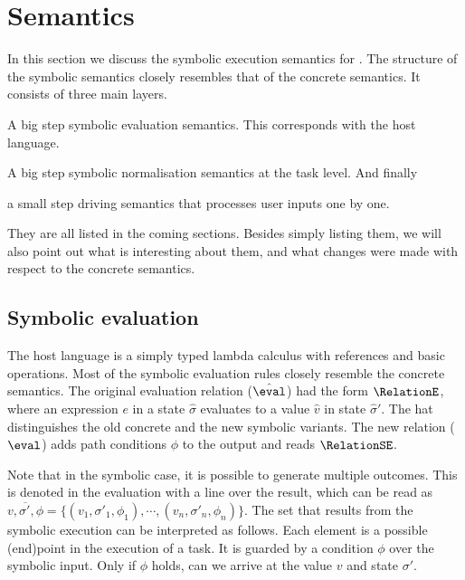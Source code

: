 
\section{Semantics}
\label{sec:semantics}

In this section we discuss the symbolic execution semantics for \TOPHAT.
The structure of the symbolic semantics closely resembles that of the concrete semantics.
It consists of three main layers.
\begin{enumerate*}
  \item A big step symbolic evaluation semantics.
  This corresponds with the host language.
  \item A big step symbolic normalisation semantics at the task level.
  And finally
  \item a small step driving semantics that processes user inputs one by one.
\end{enumerate*}

They are all listed in the coming sections.
Besides simply listing them, we will also point out what is interesting about them,
and what changes were made with respect to the concrete semantics.



\subsection{Symbolic evaluation}

The host language is a simply typed lambda calculus with references and basic operations.
Most of the symbolic evaluation rules closely resemble the concrete semantics.
The original evaluation relation ($\hat{\eval}$) had the form $\RelationE$,
where an expression $e$ in a state $\hat{\sigma}$ evaluates to a value $\hat{v}$ in state $\hat{\sigma}'$.
The hat distinguishes the old concrete and the new symbolic variants.
The new relation ($\eval$) adds path conditions $\phi$ to the output and reads $\RelationSE$.

Note that in the symbolic case, it is possible to generate multiple outcomes.
This is denoted in the evaluation with a line over the result, which can be read as $\overline{v,\sigma',\phi} = \{(v_1,\sigma'_1,\phi_1),\cdots,(v_n,\sigma'_n,\phi_n)\}$.
The set that results from the symbolic execution can be interpreted as follows.
Each element is a possible (end)point in the execution of a task.
It is guarded by a condition $\phi$ over the symbolic input.
Only if $\phi$ holds, can we arrive at the value $v$ and state $\sigma'$.

